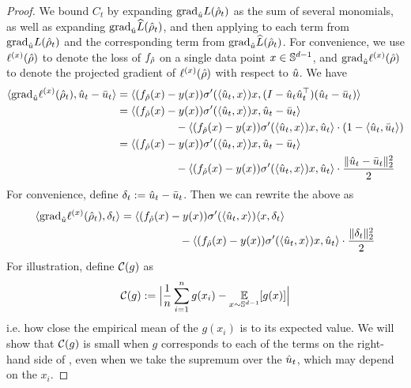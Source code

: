 \begin{proof}
We bound $C_t$ by expanding ${\textup{grad}}_{\hat{u}} L({\hat{\rho}}_t)$ as the sum of several monomials, as well as expanding ${\textup{grad}}_{\hat{u}} \widehat{L}({\hat{\rho}}_t)$, and then applying  to each term from ${\textup{grad}}_{\hat{u}} L({\hat{\rho}}_t)$ and the corresponding term from ${\textup{grad}}_{\hat{u}} \widehat{L}({\hat{\rho}}_t)$. For convenience, we use $\ell^{(x)}({\hat{\rho}})$ to denote the loss of $f_{{\hat{\rho}}}$ on a single data point $x \in \mathbb{S}^{d - 1}$, and ${\textup{grad}}_{\hat{u}} \ell^{(x)}({\hat{\rho}})$ to denote the projected gradient of $\ell^{(x)}({\hat{\rho}})$ with respect to $\hat{u}$. We have
\begin{align}
\langle {\textup{grad}}_{\hat{u}} \ell^{(x)}({\hat{\rho}}_t), \hat{u}_t - \bar{u}_t \rangle
& = \langle (f_{{\hat{\rho}}}(x) - y(x)) \sigma'(\langle \hat{u}_t, x \rangle) x, (I - \hat{u}_t \hat{u}_t^\top) (\hat{u}_t - \bar{u}_t) \rangle \\
& = \langle (f_{{\hat{\rho}}}(x) - y(x)) \sigma'(\langle \hat{u}_t, x \rangle) x, \hat{u}_t - \bar{u}_t \rangle \\ 
& \,\,\,\,\,\,\,\,\,\,\,\,\,\,\,\,\,\,\,\,\,\,\,\,\,\,\,\,\,\,\,\, - \langle (f_{{\hat{\rho}}}(x) - y(x)) \sigma'(\langle \hat{u}_t, x \rangle) x, \hat{u}_t \rangle \cdot (1 - \langle \hat{u}_t, \bar{u}_t \rangle) \\
& = \langle (f_{{\hat{\rho}}}(x) - y(x)) \sigma'(\langle \hat{u}_t, x \rangle) x, \hat{u}_t - \bar{u}_t \rangle \\ 
& \,\,\,\,\,\,\,\,\,\,\,\,\,\,\,\,\,\,\,\,\,\,\,\,\,\,\,\,\,\,\,\, - \langle (f_{{\hat{\rho}}}(x) - y(x)) \sigma'(\langle \hat{u}_t, x \rangle) x, \hat{u}_t \rangle \cdot \frac{\|\hat{u}_t - \bar{u}_t\|_2^2}{2}
\end{align}
For convenience, define $\delta_t := \hat{u}_t - \bar{u}_t$. Then we can rewrite the above as
\begin{align} \label{eq:ct_decompose_datapoint_grad}
\langle {\textup{grad}}_{\hat{u}} \ell^{(x)}({\hat{\rho}}_t), \delta_t \rangle
& = \langle (f_{{\hat{\rho}}}(x) - y(x)) \sigma'(\langle \hat{u}_t, x \rangle) \langle x, \delta_t \rangle \\ 
& \,\,\,\,\,\,\,\,\,\,\,\,\,\,\,\,\,\,\,\,\,\,\,\,\,\,\,\,\,\,\,\, - \langle (f_{{\hat{\rho}}}(x) - y(x)) \sigma'(\langle \hat{u}_t, x \rangle) x, \hat{u}_t \rangle \cdot \frac{\|\delta_t\|_2^2}{2}
\end{align}
For illustration, define $\mathcal{C}(g)$ as
\begin{align}
\mathcal{C}(g) := \Big|\frac{1}{n} \sum_{i = 1}^n g(x_i) - \operatorname*{\mathbb{E}}_{x \sim \mathbb{S}^{d - 1}} [g(x)] \Big|
\end{align}
i.e. how close the empirical mean of the $g(x_i)$ is to its expected value. We will show that $\mathcal{C}(g)$ is small when $g$ corresponds to each of the terms on the right-hand side of , even when we take the supremum over the $\hat{u}_t$, which may depend on the $x_i$.


\end{proof}
